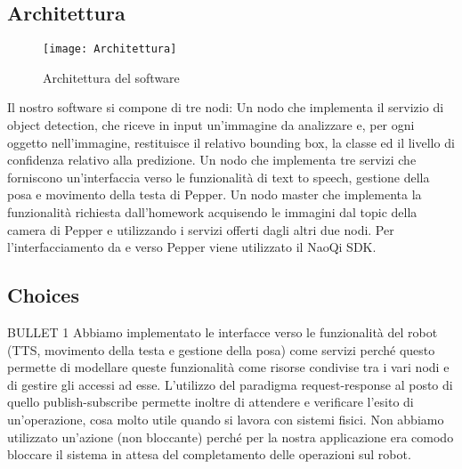 \subsection{Architettura}

\begin{figure}[ht]
	\centering
	\texttt{[image: Architettura]}
	\caption{Architettura del software}
	\label{fig:architecture}
\end{figure}

Il nostro software si compone di tre nodi:
Un nodo che implementa il servizio di object detection, che riceve in input un’immagine da analizzare e, per ogni oggetto nell’immagine, restituisce il relativo bounding box, la classe ed il livello di confidenza relativo alla predizione.
Un nodo che implementa tre servizi che forniscono un’interfaccia verso le funzionalità di text to speech, gestione della posa e movimento della testa di Pepper.
Un nodo master che implementa la funzionalità richiesta dall’homework acquisendo le immagini dal topic della camera di Pepper e utilizzando i servizi offerti dagli altri due nodi.
Per l’interfacciamento da e verso Pepper viene utilizzato il NaoQi SDK.

\subsection{Choices}

BULLET 1
Abbiamo implementato le interfacce verso le funzionalità del robot (TTS, movimento della testa e gestione della posa) come servizi perché questo permette di modellare queste funzionalità come risorse condivise tra i vari nodi e di gestire gli accessi ad esse. L'utilizzo del paradigma request-response al posto di quello publish-subscribe permette inoltre di attendere e verificare l'esito di un'operazione, cosa molto utile quando si lavora con sistemi fisici.
Non abbiamo utilizzato un'azione (non bloccante) perché per la nostra applicazione era comodo bloccare il sistema in attesa del completamento delle operazioni sul robot.

